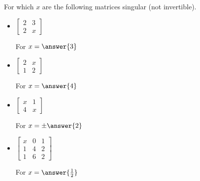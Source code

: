 \documentclass{ximera}
\begin{document}

\begin{exercise}
    For which $x$ are the following matrices singular (not invertible).
    \begin{itemize}
        \item
        $\begin{bmatrix}
            2 & 3 \\
            2 & x
        \end{bmatrix}$
        
        For $x = \answer{3}$
        \item
        $\begin{bmatrix}
            2 & x \\
            1 & 2
        \end{bmatrix}$
        
        For $x = \answer{4}$
        \item
        $\begin{bmatrix}
            x & 1 \\
            4 & x
        \end{bmatrix}$
        
        For $x = \pm\answer{2}$
        \item
        $\begin{bmatrix}
            x & 0 & 1 \\
            1 & 4 & 2 \\
            1 & 6 & 2
        \end{bmatrix}$
        
        For $x = \answer{\frac{1}{2}}$
    \end{itemize}
\end{exercise}
\end{document}
